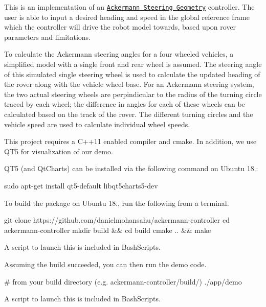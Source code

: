 \href{https://travis-ci.org/danielmohansahu/ackermann-controller}{\tt } \href{https://coveralls.io/github/danielmohansahu/ackermann-controller?branch=master}{\tt } 

This is an implementation of an \href{https://en.wikipedia.org/wiki/Ackermann_steering_geometry}{\tt Ackermann Steering Geometry} controller. The user is able to input a desired heading and speed in the global reference frame which the controller will drive the robot model towards, based upon rover parameters and limitations.

To calculate the Ackermann steering angles for a four wheeled vehicles, a simplified model with a single front and rear wheel is assumed. The steering angle of this simulated single steering wheel is used to calculate the updated heading of the rover along with the vehicle wheel base. For an Ackermann steering system, the two actual steering wheels are perpindicular to the radius of the turning circle traced by each wheel; the difference in angles for each of these wheels can be calculated based on the track of the rover. The different turning circles and the vehicle speed are used to calculate individual wheel speeds.

This project requires a C++11 enabled compiler and {\ttfamily cmake}. In addition, we use Q\+T5 for visualization of our demo.

Q\+T5 (and Qt\+Charts) can be installed via the following command on Ubuntu 18.\+:


\begin{DoxyCode}
sudo apt-get install qt5-default libqt5charts5-dev
\end{DoxyCode}


To build the package on Ubuntu 18., run the following from a terminal.


\begin{DoxyCode}
git clone https://github.com/danielmohansahu/ackermann-controller
cd ackermann-controller
mkdir build && cd build
cmake .. && make
\end{DoxyCode}
 A script to launch this is included in Bash\+Scripts.

Assuming the build succeeded, you can then run the demo code.


\begin{DoxyCode}
# from your build directory (e.g. ackermann-controller/build/)
./app/demo
\end{DoxyCode}


A script to launch this is included in Bash\+Scripts.

